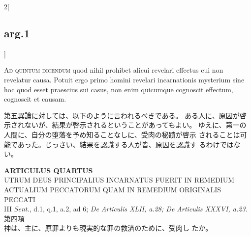\documentclass[paper=a4paper,fontsize=10pt,jafontsize=9pt,titlepage]{jlreq}
\begin{document}
\begin{paracol}{2}[\subsection{arg.1}]
\switchcolumn*[\subsection{ad.5}]

{\scshape Ad quintum dicendum} quod nihil prohibet
alicui revelari effectus cui non revelatur causa. Potuit ergo primo
homini revelari incarnationis mysterium sine hoc quod esset praescius
sui casus, non enim quicumque cognoscit effectum, cognoscit et causam.

\switchcolumn

第五異論に対しては、以下のように言われるべきである。
ある人に、原因が啓示されないが、結果が啓示されるということがあってもよい。
 ゆえに、第一の人間に、自分の堕落を予め知ることなしに、受肉の秘蹟が啓示
 されることは可能であった。じっさい、結果を認識する人が皆、原因を認識す
 るわけではない。

\end{paracol}
\newpage
{}
{}
\setcounter{section}{4}
\setcounter{subsection}{0}



\begin{center}
 {\Large {\bfseries ARTICULUS QUARTUS}}\\
 {\large UTRUM DEUS PRINCIPALIUS INCARNATUS FUERIT IN REMEDIUM ACTUALIUM
 PECCATORUM QUAM IN REMEDIUM ORIGINALIS PECCATI}\\
 {\footnotesize III {\itshape Sent.}, d.1, q.1, a.2, ad 6; {\itshape De
 Articulis XLII, a.28; {\itshape De Articulis XXXVI}, a.23.}}\\
 {\Large 第四項\\神は、主に、原罪よりも現実的な罪の救済のために、受肉し
 たか。}
\end{center}
\end{document}

